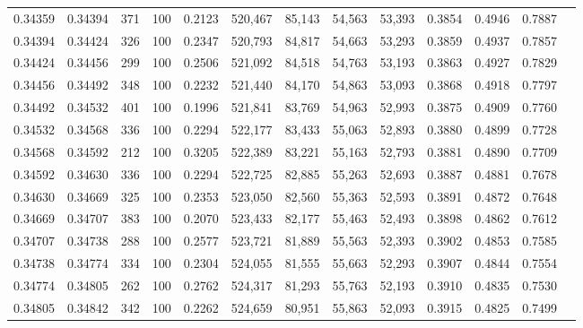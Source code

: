 \begin{tabular}{rrrrrrrrrrrrr}
0.34359 & 0.34394 &   371 & 100 &                                     0.2123 & 520,467 &  85,143 &  54,563 &  53,393 & 0.3854 & 0.4946 & 0.7887 \\
0.34394 & 0.34424 &   326 & 100 &                                     0.2347 & 520,793 &  84,817 &  54,663 &  53,293 & 0.3859 & 0.4937 & 0.7857 \\
0.34424 & 0.34456 &   299 & 100 &                                     0.2506 & 521,092 &  84,518 &  54,763 &  53,193 & 0.3863 & 0.4927 & 0.7829 \\
0.34456 & 0.34492 &   348 & 100 &                                     0.2232 & 521,440 &  84,170 &  54,863 &  53,093 & 0.3868 & 0.4918 & 0.7797 \\
0.34492 & 0.34532 &   401 & 100 &                                     0.1996 & 521,841 &  83,769 &  54,963 &  52,993 & 0.3875 & 0.4909 & 0.7760 \\
0.34532 & 0.34568 &   336 & 100 &                                     0.2294 & 522,177 &  83,433 &  55,063 &  52,893 & 0.3880 & 0.4899 & 0.7728 \\
0.34568 & 0.34592 &   212 & 100 &                                     0.3205 & 522,389 &  83,221 &  55,163 &  52,793 & 0.3881 & 0.4890 & 0.7709 \\
0.34592 & 0.34630 &   336 & 100 &                                     0.2294 & 522,725 &  82,885 &  55,263 &  52,693 & 0.3887 & 0.4881 & 0.7678 \\
0.34630 & 0.34669 &   325 & 100 &                                     0.2353 & 523,050 &  82,560 &  55,363 &  52,593 & 0.3891 & 0.4872 & 0.7648 \\
0.34669 & 0.34707 &   383 & 100 &                                     0.2070 & 523,433 &  82,177 &  55,463 &  52,493 & 0.3898 & 0.4862 & 0.7612 \\
0.34707 & 0.34738 &   288 & 100 &                                     0.2577 & 523,721 &  81,889 &  55,563 &  52,393 & 0.3902 & 0.4853 & 0.7585 \\
0.34738 & 0.34774 &   334 & 100 &                                     0.2304 & 524,055 &  81,555 &  55,663 &  52,293 & 0.3907 & 0.4844 & 0.7554 \\
0.34774 & 0.34805 &   262 & 100 &                                     0.2762 & 524,317 &  81,293 &  55,763 &  52,193 & 0.3910 & 0.4835 & 0.7530 \\
0.34805 & 0.34842 &   342 & 100 &                                     0.2262 & 524,659 &  80,951 &  55,863 &  52,093 & 0.3915 & 0.4825 & 0.7499 \\

\end{tabular}
